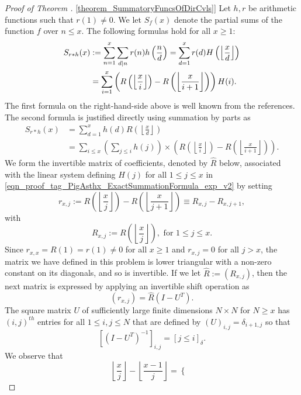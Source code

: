 \documentclass[11pt,reqno,a4letter]{article}
\newcommand{\hlocalref}[1]{\hyperref[#1]{\ref{#1}}}
\numberwithin{equation}{section}
\numberwithin{figure}{section}
\numberwithin{table}{section}
\newcommand{\Iverson}[1]{\ensuremath{\left[#1\right]_{\delta}}}
\newcommand{\floor}[1]{\left\lfloor #1 \right\rfloor}
\newcommand{\Floor}[2]{\ensuremath{\left\lfloor \frac{#1}{#2} \right\rfloor}}
\theoremstyle{plain}
\numberwithin{theorem}{section}
\theoremstyle{definition}
\begin{document}
\begin{proof}[Proof of Theorem \hlocalref{theorem_SummatoryFuncsOfDirCvls}] 
\label{proofOf_theorem_SummatoryFuncsOfDirCvls} 
Let $h,r$ be arithmetic functions such that $r(1) \neq 0$. 
We let $S_{f}(x)$ denote the partial sums of the function $f$ over $n \leq x$. 
The following formulas hold for all $x \geq 1$: 
\begin{align} 
\notag 
S_{r \ast h}(x) & := \sum_{n=1}^{x} \sum_{d|n} r(n) h\left(\frac{n}{d}\right) = 
     \sum_{d=1}^x r(d) H\left(\floor{\frac{x}{d}}\right) \\ 
\label{eqn_proof_tag_PigAsthx_ExactSummationFormula_exp_v2} 
     & = \sum_{i=1}^x \left(R\left(\floor{\frac{x}{i}}\right) - R\left(\floor{\frac{x}{i+1}}\right)\right) H(i). 
\end{align} 
The first formula on the right-hand-side above is well known from the references. 
The second formula is justified directly using 
summation by parts as \cite[\S 2.10(ii)]{NISTHB} 
\begin{align*} 
S_{r \ast h}(x) & = \sum_{d=1}^x h(d) R\left(\floor{\frac{x}{d}}\right) \\ 
     & = \sum_{i \leq x} \left(\sum_{j \leq i} h(j)\right) \times 
     \left(R\left(\floor{\frac{x}{i}}\right) - 
     R\left(\floor{\frac{x}{i+1}}\right)\right). 
\end{align*} 
We form the invertible matrix of coefficients, denoted by $\hat{R}$ below, 
associated with the linear system defining $H(j)$ for all 
$1 \leq j \leq x$ in \eqref{eqn_proof_tag_PigAsthx_ExactSummationFormula_exp_v2} by setting 
\[
r_{x,j} := R\left(\floor{\frac{x}{j}}\right) - R\left(\floor{\frac{x}{j+1}}\right) 
     \equiv R_{x,j} - R_{x,j+1}, 
\] 
with 
\[
R_{x,j} := R\left(\Floor{x}{j}\right), \text{ for } 1 \leq j \leq x. 
\]
Since $r_{x,x} = R(1) = r(1) \neq 0$ for all $x \geq 1$ and $r_{x,j} = 0$ for all $j > x$, 
the matrix we have defined in this problem is lower triangular with a non-zero 
constant on its diagonals, and so is invertible. 
If we let $\hat{R} := (R_{x,j})$, then the next matrix is 
expressed by applying an invertible shift operation as 
\[
(r_{x,j}) = \hat{R} \left(I - U^{T}\right). 
\]
The square matrix $U$ of sufficiently large finite dimensions $N \times N$ for $N \geq x$ 
has $(i,j)^{th}$ entries for all $1 \leq i,j \leq N$ that are defined by 
$(U)_{i,j} = \delta_{i+1,j}$ so that 
\[
\left[\left(I - U^T\right)^{-1}\right]_{i,j} = \Iverson{j \leq i}. 
\]
We observe that 
\[
\Floor{x}{j} - \Floor{x-1}{j} = \begin{cases} 

\end{cases}\]
\end{proof}
\end{document}
